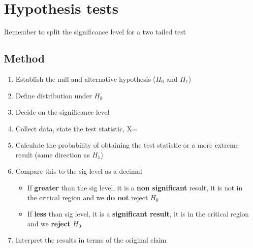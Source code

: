 \documentclass{article}[18pt]
\begin{document}
\section{Hypothesis tests}
Remember to split the significance level for a two tailed test
\subsection{Method}
\begin{enumerate}
\item Establish the null and alternative hypothesis ($H_0$ and $H_1$)
\item Define distribution under $H_0$
\item Decide on the significance level
\item Collect data, state the test statistic, X=
\item Calculate the probability of obtaining the test statistic or a more extreme result (same direction as $H_1$)
\item Compare this to the sig level as a decimal
\begin{itemize}
\item If \textbf{greater} than the sig level, it is a \textbf{non significant} result, it is not in the critical region and we \textbf{do not} reject $H_0$
\item If \textbf{less} than sig level, it is a \textbf{significant result}, it is in the critical region and we \textbf{reject} $H_0$ 
\end{itemize}
\item Interpret the results in terms of the original claim
\end{enumerate}
\end{document}
